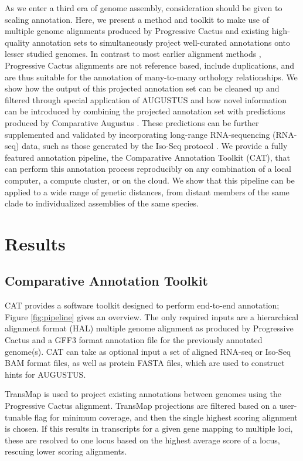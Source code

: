 \documentclass[fleqn,10pt]{wlscirep}
\begin{document}
As we enter a third era of genome assembly, consideration should be given to scaling annotation. Here, we present a method and toolkit to make use of multiple genome alignments produced by Progressive Cactus \cite{paten2011cactus} and existing high-quality annotation sets 
 to simultaneously project well-curated annotations onto lesser studied genomes. 
In contrast to most earlier alignment methods \cite{blanchette2004aligning,earl2014alignathon,miller200728}, Progressive Cactus alignments are not reference based, include duplications, and are thus suitable for the annotation of many-to-many orthology relationships. We show how the output of this projected annotation set can be cleaned up and filtered through special application of AUGUSTUS \cite{stanke2008using} and how novel information can be introduced by combining the projected annotation set with predictions produced by Comparative Augustus \cite{konig2015simultaneous}. These predictions can be further supplemented and validated by incorporating long-range RNA-sequencing (RNA-seq) data, such as those generated by the Iso-Seq protocol \cite{gordon2015widespread}. We provide a fully featured annotation pipeline, the Comparative Annotation Toolkit (CAT), that can perform this annotation process reproducibly on any combination of a local computer, a compute cluster, or on the cloud. We show that this pipeline can be applied to a wide range of genetic distances, from distant members of the same clade to individualized assemblies of the same species.


\section*{Results}

\subsection*{Comparative Annotation Toolkit}

CAT provides a software toolkit designed to perform end-to-end annotation; Figure \ref{fig:pipeline} gives an overview. The only required inputs are a hierarchical alignment format (HAL) \cite{hickey2013hal} multiple genome alignment as produced by Progressive Cactus and a GFF3 format annotation file for the previously annotated genome(s). CAT can take as optional input a set of aligned RNA-seq or Iso-Seq BAM format files, as well as protein FASTA files, which are used to construct hints for AUGUSTUS. 

TransMap\cite{stanke2008using,zhu2007comparative} is used to project existing annotations between genomes using the Progressive Cactus alignment. TransMap projections are filtered based on a user-tunable flag for minimum coverage, and then the single highest scoring alignment is chosen. If this results in transcripts for a given gene mapping to multiple loci, these are resolved to one locus based on the highest average score of a locus, rescuing lower scoring alignments. 
\end{document}
